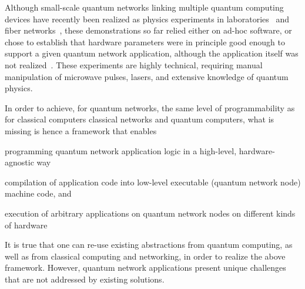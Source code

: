 Although small-scale quantum networks linking multiple quantum computing devices have recently been realized as physics experiments in laboratories~\cite{moehring_2007_ion_traps,ritter_2012_elementary,hofmann_2012_heralded,stockill_2017_phasetuned,jing2019entanglement,stephenson_2020_highrate,pompili_2021_multinode,krutyanskiy_entanglement_2023} and fiber networks~\cite{liu2024creation,stolk2024metropolitan,knaut2024entanglement}, these demonstrations so far relied either on ad-hoc software, or chose to establish that hardware parameters were in principle good enough to support a given quantum network application, although the application itself was not realized~\cite{nadlinger_device-independent_2022,liu_2022_photonic_diqkd,zhang_2022_diqkd}.
These experiments are highly technical, requiring manual manipulation of microwave pulses, lasers, and extensive knowledge of quantum physics.

In order to achieve, for quantum networks, the same level of programmability as for classical computers classical networks and quantum computers, what is missing is hence a framework that enables
\begin{inlinelist}
\item programming quantum network application logic in a high-level, hardware-agnostic way
\item compilation of application code into low-level executable (quantum network node) machine code, and
\item execution of arbitrary applications on quantum network nodes on different kinds of hardware
\end{inlinelist}

It is true that one can re-use existing abstractions from quantum computing, as well as from classical computing and networking, in order to realize the above framework.
However, quantum network applications present unique challenges that are not addressed by existing solutions.

